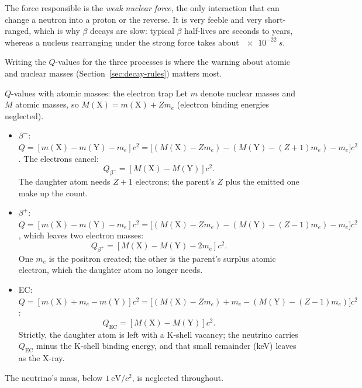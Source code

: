 The force responsible is the \emph{weak nuclear force}, the only interaction that can change a neutron
into a proton or the reverse. It is very feeble and very short-ranged, which is why $\beta$ decays are
slow: typical $\beta$ half-lives are seconds to years, whereas a nucleus rearranging under the strong
force takes about $\SI{e-22}{s}$.

Writing the $Q$-values for the three processes is where the warning about atomic and nuclear masses
(Section~\ref{sec:decay-rules}) matters most.

\begin{derivbox}{$Q$-values with atomic masses: the electron trap}
Let $m$ denote nuclear masses and $M$ atomic masses, so $M(\mathrm{X})=m(\mathrm{X})+Zm_e$ (electron
binding energies neglected).
\begin{itemize}
\item $\beta^-$: $Q=[m(\mathrm{X})-m(\mathrm{Y})-m_e]c^2=\big[(M(\mathrm{X})-Zm_e)-(M(\mathrm{Y})-(Z+1)m_e)-m_e\big]c^2$.
      The electrons cancel:
      \begin{equation}\label{eq:decay-Qbminus}
      \boxed{\;Q_{\beta^-}=[M(\mathrm{X})-M(\mathrm{Y})]c^2.\;}
      \end{equation}
      The daughter atom needs $Z+1$ electrons; the parent's $Z$ plus the emitted one make up the count.
\item $\beta^+$: $Q=[m(\mathrm{X})-m(\mathrm{Y})-m_e]c^2=\big[(M(\mathrm{X})-Zm_e)-(M(\mathrm{Y})-(Z-1)m_e)-m_e\big]c^2$,
      which leaves two electron masses:
      \begin{equation}\label{eq:decay-Qbplus}
      \boxed{\;Q_{\beta^+}=[M(\mathrm{X})-M(\mathrm{Y})-2m_e]c^2.\;}
      \end{equation}
      One $m_e$ is the positron created; the other is the parent's surplus atomic electron, which the
      daughter atom no longer needs.
\item EC: $Q=[m(\mathrm{X})+m_e-m(\mathrm{Y})]c^2=\big[(M(\mathrm{X})-Zm_e)+m_e-(M(\mathrm{Y})-(Z-1)m_e)\big]c^2$:
      \begin{equation}\label{eq:decay-Qec}
      \boxed{\;Q_{\mathrm{EC}}=[M(\mathrm{X})-M(\mathrm{Y})]c^2.\;}
      \end{equation}
      Strictly, the daughter atom is left with a K-shell vacancy; the neutrino carries $Q_{\mathrm{EC}}$ minus
      the K-shell binding energy, and that small remainder (keV) leaves as the X-ray.
\end{itemize}
The neutrino's mass, below $\SI{1}{\eV}/c^2$, is neglected throughout.
\end{derivbox}

